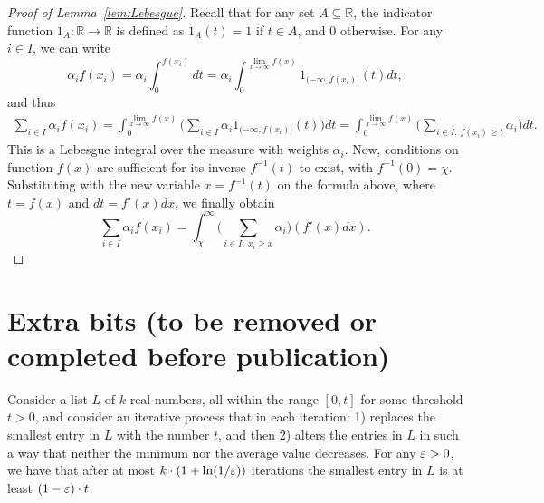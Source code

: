 \begin{proof}[Proof of Lemma~\ref{lem:Lebesgue}]
Recall that for any set $A\subseteq \mathbb{R}$, the indicator function $1_A:\mathbb{R}\rightarrow \mathbb{R}$ is defined as $1_A(t)=1$ if $t\in A$, and $0$ otherwise. For any $i\in I$, we can write
$$\alpha_i f(x_i) = \alpha_i \int_{0}^{f(x_i)} dt = \alpha_i\int_0^{\lim_{x\rightarrow \infty} f(x)} 1_{(-\infty, f(x_i)]}(t)dt,$$
and thus
\begin{align*}
    \sum_{i\in I} \alpha_i f(x_i) = \int_0^{\lim_{x\rightarrow \infty} f(x)} \Big(\sum_{i\in I} \alpha_i 1_{(-\infty, f(x_i)]}(t)\Big)dt = \int_0^{\lim_{x\rightarrow \infty} f(x)} \Big(\sum_{i\in I: \ f(x_i)\geq t} \alpha_i \Big)dt.
\end{align*}
This is a Lebesgue integral over the measure with weights $\alpha_i$. Now, conditions on function $f(x)$ are sufficient for its inverse $f^{-1}(t)$ to exist, with $f^{-1}(0)=\chi$. Substituting with the new variable $x=f^{-1}(t)$ on the formula above, where $t=f(x)$ and $dt=f'(x)dx$, we finally obtain
$$\sum_{i\in I} \alpha_i f(x_i) =\int_{\chi}^{\infty} \Big( \sum_{i\in I: \ x_i\geq x} \alpha_i \Big)(f'(x)dx).$$
\end{proof}

\section{Extra bits (to be removed or completed before publication)}

\begin{lemma}\label{lem:list}
Consider a list $L$ of $k$ real numbers, all within the range $[0,t]$ for some threshold $t>0$, and consider an iterative process that in each iteration: 
1) replaces the smallest entry in $L$ with the number $t$, and then 2) alters the entries in $L$ in such a way that neither the minimum nor the average value decreases.
For any $\varepsilon>0$, we have that after at most $k\cdot (1+\ln (1/\varepsilon))$ iterations the smallest entry in $L$ is at least $(1-\varepsilon)\cdot t$.
\end{lemma}

